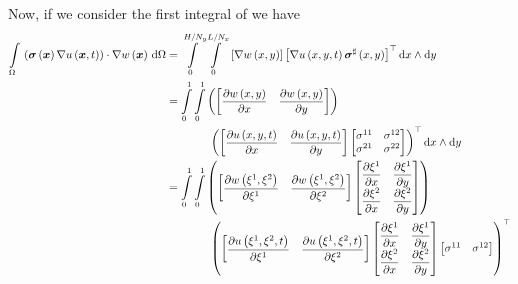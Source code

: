 Now, if we consider the first integral of  we have
\begin{equation}
  \begin{aligned}
    \gint{\Omega}{}{\dotprod{\pbrac{\fnof{\conductivitytensor}{\vectr{x}}\gradient{}{\fnof{u}{\vectr{x},t}}}}
      {\gradient{}{\fnof{w}{\vectr{x}}}}}{\Omega}
    &=\giint{0}{H/N_{y}}{0}{L/N_{x}}{\sqbrac{\gradient{}{\fnof{w}{x,y}}}
    \transpose{\sqbrac{\gradient{}{\fnof{u}{x,y,t}}\fnof{\sharptensor{\conductivitytensor}}{x,y}}}}{x}{y}\\
    &=\dintl{0}{1}\dintl{0}{1}\pbrac{\begin{bmatrix}
            \delby{\fnof{w}{x,y}}{x}&\delby{\fnof{w}{x,y}}{y}
          \end{bmatrix}}\\
    &\qquad\qquad\transpose{\pbrac{\begin{bmatrix}
          \delby{\fnof{u}{x,y,t}}{x}&\delby{\fnof{u}{x,y,t}}{y}
        \end{bmatrix}\begin{bmatrix}
          \conductivitytensorsymbol^{11} & \conductivitytensorsymbol^{12} \\
          \conductivitytensorsymbol^{21} & \conductivitytensorsymbol^{22}
    \end{bmatrix}}}\,\exteriorderivop x \wedge\exteriorderivop y \\
    &=\dintl{0}{1}\dintl{0}{1}\pbrac{\begin{bmatrix}
          \delby{\fnof{w}{\xione,\xitwo}}{\xione}&\delby{\fnof{w}{\xione,\xitwo}}{\xitwo}
        \end{bmatrix}\begin{bmatrix}
          \delby{\xione}{x} & \delby{\xione}{y} \\
          \delby{\xitwo}{x} & \delby{\xitwo}{y}
        \end{bmatrix}} \\
    &\qquad\qquad\transpose{\pbrac{\begin{bmatrix}
        \delby{\fnof{u}{\xione,\xitwo,t}}{\xione}&\delby{\fnof{u}{\xione,\xitwo,t}}{\xitwo}
      \end{bmatrix}\begin{bmatrix}
      \delby{\xione}{x} & \delby{\xione}{y} \\
      \delby{\xitwo}{x} & \delby{\xitwo}{y}
    \end{bmatrix}\begin{bmatrix}
        \conductivitytensorsymbol^{11} & \conductivitytensorsymbol^{12} \\

\end{bmatrix}}}
\end{aligned}
\end{equation}
